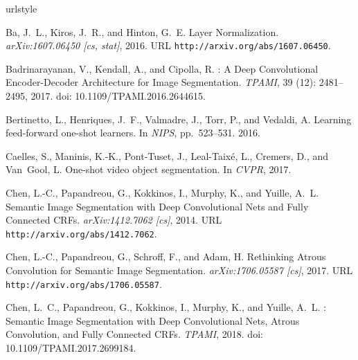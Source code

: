 \documentclass{article}
\begin{document}
\begin{thebibliography}{42}
\providecommand{\natexlab}[1]{#1}
\providecommand{\url}[1]{\texttt{#1}}
\expandafter\ifx\csname urlstyle\endcsname\relax
  \providecommand{\doi}[1]{doi: #1}\else
  \providecommand{\doi}{doi: \begingroup \urlstyle{rm}\Url}\fi

Ba, J.~L., Kiros, J.~R., and Hinton, G.~E.
\newblock Layer {Normalization}.
\newblock \emph{arXiv:1607.06450 [cs, stat]}, 2016.
\newblock URL \url{http://arxiv.org/abs/1607.06450}.

Badrinarayanan, V., Kendall, A., and Cipolla, R.
: {A} {Deep} {Convolutional} {Encoder}-{Decoder}
  {Architecture} for {Image} {Segmentation}.
\newblock \emph{TPAMI}, 39 (12): 2481--2495, 2017.
\newblock \doi{10.1109/TPAMI.2016.2644615}.

Bertinetto, L., Henriques, J.~F., Valmadre, J., Torr, P., and Vedaldi, A.
\newblock Learning feed-forward one-shot learners.
\newblock In \emph{NIPS}, pp.\  523--531. 2016.

Caelles, S., Maninis, K.-K., Pont-Tuset, J., Leal-Taix{\'e}, L., Cremers, D.,
  and Van~Gool, L.
\newblock One-shot video object segmentation.
\newblock In \emph{{CVPR}}, 2017.

Chen, L.-C., Papandreou, G., Kokkinos, I., Murphy, K., and Yuille, A.~L.
\newblock Semantic {Image} {Segmentation} with {Deep} {Convolutional} {Nets}
  and {Fully} {Connected} {CRFs}.
\newblock \emph{arXiv:1412.7062 [cs]}, 2014.
\newblock URL \url{http://arxiv.org/abs/1412.7062}.

Chen, L.-C., Papandreou, G., Schroff, F., and Adam, H.
\newblock Rethinking {Atrous} {Convolution} for {Semantic} {Image}
  {Segmentation}.
\newblock \emph{arXiv:1706.05587 [cs]}, 2017.
\newblock URL \url{http://arxiv.org/abs/1706.05587}.

Chen, L.~C., Papandreou, G., Kokkinos, I., Murphy, K., and Yuille, A.~L.
: {Semantic} {Image} {Segmentation} with {Deep}
  {Convolutional} {Nets}, {Atrous} {Convolution}, and {Fully} {Connected}
  {CRFs}.
\newblock \emph{TPAMI}, 2018.
\newblock \doi{10.1109/TPAMI.2017.2699184}.


\end{thebibliography}
\end{document}
